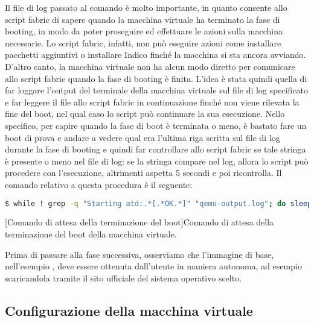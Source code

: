             Il file di log passato al comando  è molto importante, in quanto consente allo script fabric di sapere quando la macchina virtuale ha terminato la fase di booting, in modo da poter proseguire ed effettuare le azioni sulla macchina necessarie. Lo script fabric, infatti, non può eseguire azioni come installare pacchetti aggiuntivi o installare Indico finché la macchina si sta ancora avviando. D'altro canto, la macchina virtuale non ha alcun modo diretto per comunicare allo script fabric quando la fase di booting è finita. L'idea è stata quindi quella di far loggare l'output del terminale della macchina virtuale sul file di log specificato e far leggere il file allo script fabric in continuazione finché non viene rilevata la fine del boot, nel qual caso lo script può continuare la sua esecuzione. Nello specifico, per capire quando la fase di boot è terminata o meno, è bastato fare un boot di prova e andare a vedere qual era l'ultima riga scritta sul file di log durante la fase di booting e quindi far controllare allo script fabric se tale stringa è presente o meno nel file di log: se la stringa compare nel log, allora lo script può procedere con l'esecuzione, altrimenti aspetta 5 secondi e poi ricontrolla. Il comando relativo a questa procedura è il seguente:
            
            \begin{center}
                \begin{lstlisting}[language=bash, gobble=18]
                    $ while ! grep -q "Starting atd:.*[.*OK.*]" "qemu-output.log"; do sleep 5; done
                \end{lstlisting}
                \captionsetup{textformat=empty,labelformat=empty} \vspace{-2em}
                [Comando di attesa della terminazione del boot]{Comando di attesa della terminazione del boot della macchina virtuale.}
            \end{center}
            
            Prima di passare alla fase successiva, osserviamo che l'immagine di base, nell'esempio , deve essere ottenuta dall'utente in maniera autonoma, ad esempio scaricandola tramite il sito ufficiale del sistema operativo scelto.
            
        \subsection{Configurazione della macchina virtuale} \label{subsec:cd;civ;configurazione_macchina_virtuale}
        
